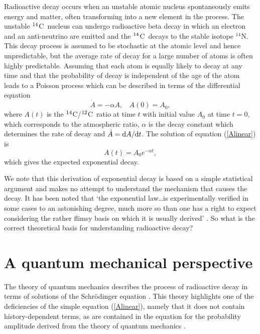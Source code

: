 \documentclass[12pt]{article}
\newcommand{\Ref}[1]{(\ref{#1})}
\newcommand{\cft}{$^{\rm 14}$C}
\newcommand{\ctw}{$^{\rm 12}$C}
\newcommand{\upd}{{\rm d}}
\begin{document}
Radioactive decay occurs when an unstable atomic nucleus spontaneously
emits energy and matter, often transforming into a new
element in the process. The unstable \cft~nucleus can undergo radioactive 
beta decay
in which an electron and an anti-neutrino are emitted and the \cft~decays
to the stable isotope $^{14}$N. This decay process is assumed to be 
stochastic at the atomic level and hence unpredictable, but the average 
rate of decay for a large number of atoms is often highly predictable. 
Assuming that each atom is equally likely to decay at any time and that the
probability of decay is independent of the age of the atom leads to 
a Poisson process \cite{evans67} which can be described in terms of the 
differential equation
\begin{equation}\label{Alinear}
\dot A=-\alpha A,~~~~A(0)=A_0,
\end{equation}
where $A(t)$ is the \cft/\ctw~ratio at time $t$ with initial value $A_0$
at time $t=0$, which corresponds to the atmospheric ratio,
$\alpha$ is the decay constant which determines the rate of 
decay and $\dot A=\upd A/\upd t$. The solution of equation \Ref{Alinear} is 
$$A(t)=A_0e^{-\alpha t},$$
which gives the expected exponential decay. 

We note that this derivation of exponential decay is based on a simple
statistical argument and
makes no attempt to understand the mechanism that causes the decay. It has
been noted that `the exponential law\ldots is experimentally
verified in some cases to an astonishing degree, much more so than one has
a right to expect considering the rather flimsy basis on which it is
usually derived' \cite[p594]{newton66}. So what is the correct theoretical
basis for understanding radioactive decay?

\section{A quantum mechanical perspective}
\label{quantum-mechanics}

The theory of quantum mechanics describes the process of radioactive 
decay in terms of solutions of the Schr\"odinger equation
\cite{fonda78,merzbacher98}. This theory highlights one of 
the deficiencies of the simple equation \Ref{Alinear},
namely that it does not contain history-dependent terms, as are contained
in the equation for the probability amplitude derived from the theory of 
quantum mechanics \cite{fonda78,peres80}. 
\end{document}
